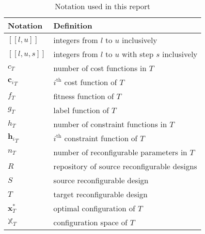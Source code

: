 \documentclass[10pt,a4paper]{article}
\newcommand{\dsb}[1]{[\![#1]\!]}
\begin{document}
\begin{table}[H]
	\begin{tabularx}{\linewidth}{l l}
		\hline
		Notation & Definition\\
		\hline
		$\dsb{l,u}$ & integers from $l$ to $u$ inclusively\\
		$\dsb{l,u,s}$ & integers from $l$ to $u$ with step $s$ inclusively\\
		$c_T$ & number of cost functions in $T$\\
		${\mathbf{c}_i}_T$ & $i^{\text{th}}$ cost function of $T$\\
		$f_T$ & fitness function of $T$\\
		$g_T$ & label function of $T$\\
		$h_T$ & number of constraint functions in $T$\\
		${\mathbf{h}_i}_T$ & $i^{\text{th}}$ constraint function of $T$\\
		$n_T$ & number of reconfigurable parameters in $T$\\
		$R$ & repository of source reconfigurable designs\\
		$S$ & source reconfigurable design\\
		$T$ & target reconfigurable design\\
		$\mathbf{x}_T^*$ & optimal configuration of $T$\\
		$\mathbb{X}_T$ & configuration space of $T$\\
		\hline
	\end{tabularx}
	\caption{Notation used in this report}
\end{table}



\end{document}
